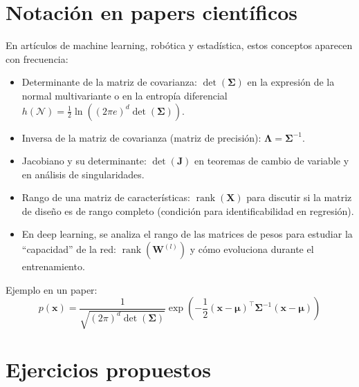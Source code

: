 \documentclass[12pt,a4paper,openany,oneside]{book}
\begin{document}
\section{Notación en papers científicos}

En artículos de machine learning, robótica y estadística, estos conceptos aparecen con frecuencia:

\begin{itemize}
    \item Determinante de la matriz de covarianza: $\det(\boldsymbol{\Sigma})$ en la expresión de la normal multivariante o en la entropía diferencial $h(\mathcal{N}) = \frac{1}{2}\ln\left((2\pi e)^d \det(\boldsymbol{\Sigma})\right)$.
    \item Inversa de la matriz de covarianza (matriz de precisión): $\boldsymbol{\Lambda} = \boldsymbol{\Sigma}^{-1}$.
    \item Jacobiano y su determinante: $\det(\mathbf{J})$ en teoremas de cambio de variable y en análisis de singularidades.
    \item Rango de una matriz de características: $\operatorname{rank}(\mathbf{X})$ para discutir si la matriz de diseño es de rango completo (condición para identificabilidad en regresión).
    \item En deep learning, se analiza el rango de las matrices de pesos para estudiar la ``capacidad'' de la red: $\operatorname{rank}(\mathbf{W}^{(l)})$ y cómo evoluciona durante el entrenamiento.
\end{itemize}

Ejemplo en un paper:
\[
p(\mathbf{x}) = \frac{1}{\sqrt{(2\pi)^d \det(\boldsymbol{\Sigma})}} \exp\left( -\frac{1}{2} (\mathbf{x}-\boldsymbol{\mu})^\top \boldsymbol{\Sigma}^{-1} (\mathbf{x}-\boldsymbol{\mu}) \right)
\]

\section{Ejercicios propuestos}
\end{document}

